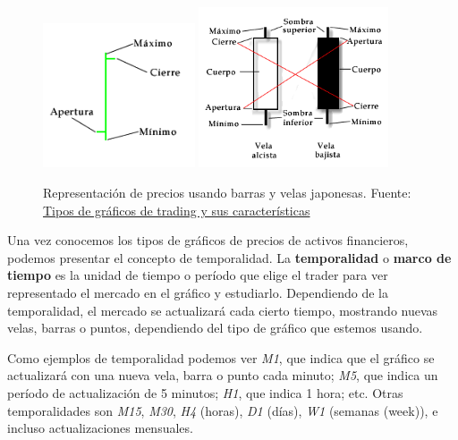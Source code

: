 \begin{figure}[h]
	\includegraphics[width=0.4\textwidth]{imagenes/representacion_barra_OHLC.png} 
	\includegraphics[width=0.5\textwidth]{imagenes/representacion_vela_OHLC.png} 
	\caption{Representación de precios usando barras y velas japonesas. Fuente: \color{blue} \label{ohlc} \href{https://efxto.com/escuela/tipos-de-graficos-de-trading}{Tipos de gráficos de trading y sus características}} 
\end{figure} 

Una vez conocemos los tipos de gráficos de precios de activos financieros, podemos presentar el concepto de temporalidad. La \textbf{temporalidad} o \textbf{marco de tiempo} es la unidad de tiempo o período que elige el trader para ver representado el mercado en el gráfico y estudiarlo. Dependiendo de la temporalidad, el mercado se actualizará cada cierto tiempo, mostrando nuevas velas, barras o puntos, dependiendo del tipo de gráfico que estemos usando. \newline

Como ejemplos de temporalidad podemos ver \textit{M1}, que indica que el gráfico se actualizará con una nueva vela, barra o punto cada minuto; \textit{M5}, que indica un período de actualización de 5 minutos; \textit{H1}, que indica 1 hora; etc. Otras temporalidades son \textit{M15}, \textit{M30}, \textit{H4} (horas), \textit{D1} (días), \textit{W1} (semanas (week)), e incluso actualizaciones mensuales. \newline

